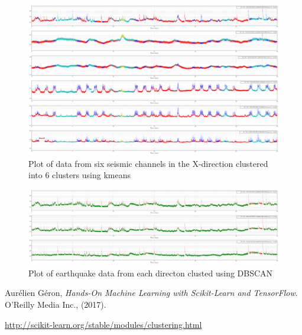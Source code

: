 \documentclass[colorlinks=true,pdfstartview=FitV,linkcolor=blue,
            citecolor=red,urlcolor=magenta]{ligodoc}
\begin{document}
\begin{figure}[htbp]
\begin{center}
\includegraphics[width=1.3\textwidth,angle=90]{all_X_6_data_data.png}
\caption{Plot of data from six seismic channels in the X-direction clustered into 6 clusters using kmeans}
\label{fig:image1}
\end{center}
\end{figure}

\begin{figure}[htbp]
\begin{center}
\includegraphics[width=1.3\textwidth,angle=90]{dbscan_EQ_XYZ_data_data.png}
\caption{Plot of earthquake data from each directon clusted using DBSCAN}
\label{fig:image2}
\end{center}
\end{figure}

\begin{thebibliography}{9}
      
	  Aurélien Géron,
	  \emph{Hands-On Machine Learning with Scikit-Learn and TensorFlow}.
	 O'Reilly Media Inc., (2017).    
      
       \url{http://scikit-learn.org/stable/modules/clustering.html}
 
\end{thebibliography}
\end{document}

